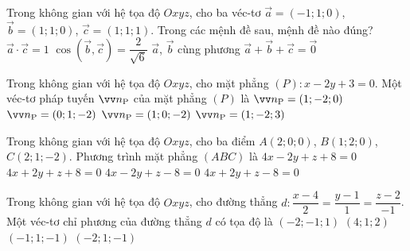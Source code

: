 \begin{ex}%
	Trong không gian với hệ tọa độ $ Oxyz $, cho ba véc-tơ $ \vec{a}=(-1;1;0) $, $ \vec{b}=(1;1;0) $, $ \vec{c}=(1;1;1) $. Trong các mệnh đề sau, mệnh đề nào đúng?
	\choice
	{$ \vec{a}\cdot \vec{c}=1 $}
	{\True $ \cos(\vec{b},\vec{c})=\dfrac{2}{\sqrt{6}} $}
	{$ \vec{a}$, $\vec{b}$ cùng phương}
	{$ \vec{a}+\vec{b}+\vec{c}=\vec{0} $}
\end{ex}
\begin{ex}%
	Trong không gian với hệ tọa độ $ Oxyz $, cho mặt phẳng $ (P)\colon x-2y+3=0 $. Một véc-tơ pháp tuyến $ \vec{n}_{\tiny{\text{P}}} $ của mặt phẳng $ (P) $ là
	\choice
	{\True $ \vec{n}_{\tiny{\text{P}}}=(1;-2;0) $}
	{$ \vec{n}_{\tiny{\text{P}}}=(0;1;-2) $}
	{$ \vec{n}_{\tiny{\text{P}}}=(1;0;-2) $}
	{$ \vec{n}_{\tiny{\text{P}}}=(1;-2;3) $}
\end{ex}
\begin{ex}%
	Trong không gian với hệ tọa độ $ Oxyz $, cho ba điểm $ A(2;0;0) $, $ B(1;2;0) $, $ C(2;1;-2) $. Phương trình mặt phẳng $ (ABC) $ là
	\choice
		{$ 4x-2y+z+8=0 $}
	{$ 4x+2y+z+8=0 $}
	{\True $ 4x-2y+z-8=0 $}
	{$ 4x+2y+z-8=0 $}
\end{ex}
\begin{ex}%
	Trong không gian với hệ tọa độ $ Oxyz $, cho đường thẳng $ d\colon \dfrac{x-4}{2}=\dfrac{y-1}{1}=\dfrac{z-2}{-1} $. Một véc-tơ chỉ phương của đường thẳng $ d $ có tọa độ là
	\choice
	{\True $ (-2;-1;1) $}
	{$ (4;1;2) $}
	{$ (-1;1;-1) $}
	{$ (-2;1;-1) $}
\end{ex}
